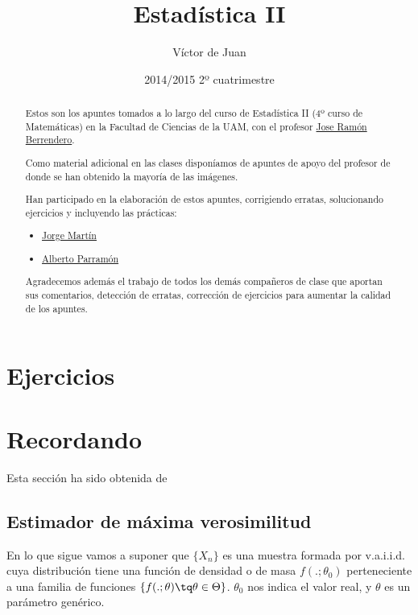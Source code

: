 \documentclass[palatino,nochap]{apuntes}
\author{Víctor de Juan}
\date{2014/2015 2º cuatrimestre}
\title{Estadística II}
\begin{document}
\begin{abstract}

Estos son los apuntes tomados a lo largo del curso de Estadística II (4º curso de Matemáticas) en la Facultad de Ciencias de la UAM, con el profesor \href{http://www.uam.es/joser.berrendero}{Jose Ramón Berrendero}. 


Como material adicional en las clases disponíamos de apuntes de apoyo del profesor de donde se han obtenido la mayoría de las imágenes.

Han participado en la elaboración de estos apuntes, corrigiendo erratas, solucionando ejercicios y incluyendo las prácticas:

\begin{itemize}
     \item \href{https://github.com/MartinPJorge}{Jorge Martín}
     \item \href{https://github.com/AlbertoParramon}{Alberto Parramón}
 \end{itemize}  

Agradecemos además el trabajo de todos los demás compañeros de clase que aportan sus comentarios, detección de erratas, corrección de ejercicios para aumentar la calidad de los apuntes.

\end{abstract}


\pagestyle{plain}
\maketitle

\tableofcontents
\newpage







\appendix
\chapter{Ejercicios}


\chapter{Recordando}
Esta sección ha sido obtenida de \citep{ApuntesEstI}

\section{Estimador de máxima verosimilitud}
\label{sec:estimadorMaximaVerosimilitud}
En lo que sigue vamos a suponer que $\{X_n\}$ es una muestra formada por v.a.i.i.d. cuya distribución tiene una función de densidad o de masa $f(.;\theta_0)$ perteneciente a una familia de funciones $\{f(.;\theta) \tq \theta \in \Theta\}$. $\theta_0$ nos indica el valor real, y $\theta$ es un parámetro genérico.
\end{document}
